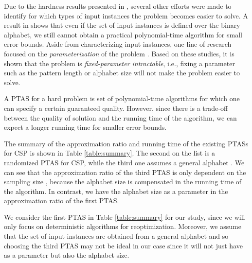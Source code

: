 \documentclass[journal]{acm_proc_article-sp}
\begin{document}
Due to the hardness results presented in \cite{Bodlaender1995}, several other efforts were made to identify  for which types of input instances the problem becomes easier to solve. A result in \cite{Brejova2006} shows that even if the set of input instances is defined over the binary alphabet, we still cannot obtain a practical polynomial-time algorithm for small error bounds.  Aside from characterizing input instances, one line of research focused on the \textit{parameterization} of the problem  \cite{Evans2003}. Based on these studies, it is shown that the problem is \textit{fixed-parameter intractable}, i.e., fixing a parameter such as the pattern length or alphabet size will not make the problem easier to solve.

A PTAS for a hard problem is set of polynomial-time algorithms  for which one can specify a certain guaranteed quality. However, since there is a trade-off between the quality of solution and the  running time of the algorithm, we can expect a longer running time for smaller error bounds. 

The summary of the approximation ratio and running time of the existing PTASs for CSP is shown in Table \ref{table:summary}. The second on the list is a randomized PTAS for CSP, while the third one assumes a general alphabet . We can see that the approximation ratio of the third PTAS is only dependent on the sampling size , because the alphabet size is compensated in the running time of the algorithm. In contrast, we have the alphabet size as a parameter in the approximation ratio of the first PTAS. 

\begin{table}
\centering
{}
\caption{Summary of approximation ratio and running time of the existing PTASs for CSP in the literature.}
\label{table:summary}
\end{table}

We consider the first PTAS in Table \ref{table:summary} for our study, since we will  only focus on deterministic algorithms for reoptimization. Moreover, we assume that the set of input instances are obtained from  a general alphabet  and so choosing the third PTAS may not be ideal in our case since it will not just have  as a parameter but also the alphabet size.
\end{document}
